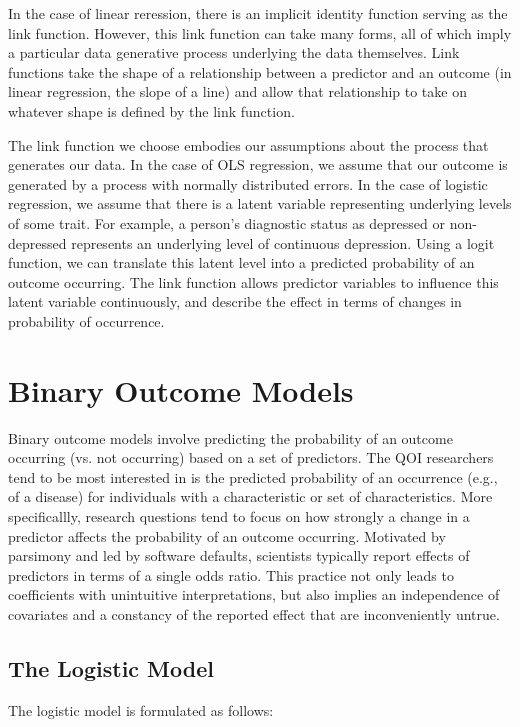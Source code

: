 \documentclass[jou, apacite]{apa6}
\begin{document}
In the case of linear reression, there is an implicit identity function serving as the link function.
However, this link function can take many forms, all of which imply a particular data generative process underlying the data themselves.
Link functions take the shape of a relationship between a predictor and an outcome (in linear regression, the slope of a line) and allow that relationship to take on whatever shape is defined by the link function.

The link function we choose embodies our assumptions about the process that generates our data.
In the case of OLS regression, we assume that our outcome is generated by a process with normally distributed errors.
In the case of logistic regression, we assume that there is a latent variable representing underlying levels of some trait. 
For example, a person's diagnostic status as depressed or non-depressed represents an underlying level of continuous depression. 
Using a logit function, we can translate this latent level into a predicted probability of an outcome occurring.
The link function allows predictor variables to influence this latent variable continuously, and describe the effect in terms of changes in probability of occurrence.
\section{Binary Outcome Models}

Binary outcome models involve predicting the probability of an outcome occurring (vs. not occurring) based on a set of predictors. 
The QOI researchers tend to be most interested in is the predicted probability of an occurrence (e.g., of a disease) for individuals with a characteristic or set of characteristics.
More specificallly, research questions tend to focus on how strongly a change in a predictor affects the probability of an outcome occurring.
Motivated by parsimony and led by software defaults, scientists typically report effects of predictors in terms of a single odds ratio.
This practice not only leads to coefficients with unintuitive interpretations, but also implies an independence of covariates and a constancy of the reported effect that are inconveniently untrue.

\subsection{The Logistic Model}

The logistic model is formulated as follows:
\end{document}
